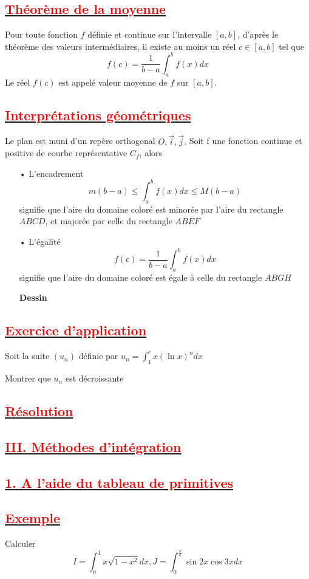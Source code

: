 \documentclass[12pt]{article}
\begin{document}
\subsection*{\underline{\textbf{\textcolor{red}{Théorème de la moyenne }}}}
Pour toute fonction $f$ définie et continue sur l'intervalle $[a, b]$, d'après le théorème des valeurs intermédiaires, il existe au moins un réel $c\in [a, b]$ tel que
\[f(c) =\frac{1}{b-a}\int_{a}^{b}f(x)dx \]
Le réel $f(c)$ est appelé valeur moyenne de $f$ sur $[a, b]$.
\subsection*{\underline{\textbf{\textcolor{red}{Interprétations géométriques }}}}
Le plan est muni d'un repère orthogonal  $O,\vec{i},\vec{j}.$ Soit f une fonction continue et positive de courbe représentative $C_{f}$, alors
\begin{itemize}
\item[•] L'encadrement \[m(b-a)\leq \int_{a}^{b}f(x)dx \leq M(b-a)\] signifie que l'aire du domaine coloré est minorée par l'aire du rectangle $ABCD$, et majorée par celle du rectangle $ABEF$
\item[•]  L'égalité \[f(c) =\frac{1}{b-a}\int_{a}^{b}f(x)dx \] signifie que l'aire du domaine coloré est égale à celle du rectangle $ABGH$

\textbf{Dessin}
\end{itemize}
\subsection*{\underline{\textbf{\textcolor{red}{Exercice d'application }}}}
Soit la suite $(u_{n})$ définie par $u_{n}=\int_{1}^{e}x(\ln x)^{n}dx$

Montrer que $u_{n}$ est décroissante
\subsection*{\underline{\textbf{\textcolor{red}{Résolution  }}}}
\subsection*{\underline{\textbf{\textcolor{red}{III. Méthodes d'intégration }}}}
\subsection*{\underline{\textbf{\textcolor{red}{1. A l'aide du tableau de primitives }}}}
\subsection*{\underline{\textbf{\textcolor{red}{Exemple  }}}}
Calculer \[I=\int_{0}^{1}x\sqrt{1-x^{2}}dx, J=\int_{0}^{\frac{\pi}{6}}\sin 2x \cos 3x dx\]
\end{document}
